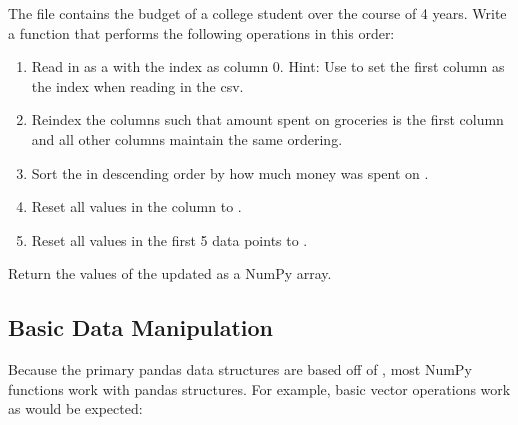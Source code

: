 \begin{problem}
The file  contains the budget of a college student over the course of 4 years.
Write a function that performs the following operations in this order:
\begin{enumerate}
\item Read in  as a  with the index as column 0. Hint: Use  to set the first column as the index when reading in the csv.
\item Reindex the columns such that amount spent on groceries is the first column and all other columns maintain the same ordering.
\item Sort the  in descending order by how much money was spent on .
\item Reset all values in the  column to .
\item Reset all values in the first 5 data points to .
\end{enumerate}
Return the values of the updated  as a NumPy array.

\label{prob:budget}
\end{problem}

\subsection*{Basic Data Manipulation}
Because the primary pandas data structures are based off of , most NumPy functions work with pandas structures.
For example, basic vector operations work as would be expected:

